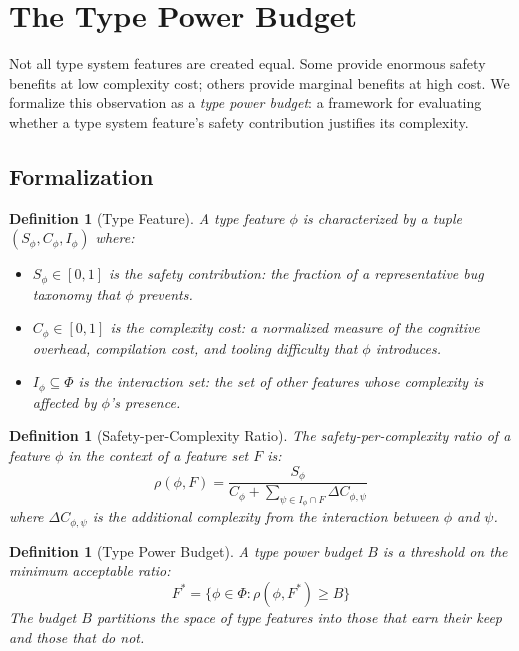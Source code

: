 \documentclass[11pt,twocolumn]{article}
\newtheorem{definition}[theorem]{Definition}
\begin{document}
\section{The Type Power Budget}
\label{sec:type-power-budget}

Not all type system features are created equal.
Some provide enormous safety benefits at low complexity cost; others provide marginal benefits at high cost.
We formalize this observation as a \emph{type power budget}: a framework for evaluating whether a type system feature's safety contribution justifies its complexity.

\subsection{Formalization}

\begin{definition}[Type Feature]
A type feature $\phi$ is characterized by a tuple $(S_\phi, C_\phi, I_\phi)$ where:
\begin{itemize}
\item $S_\phi \in [0, 1]$ is the \emph{safety contribution}: the fraction of a representative bug taxonomy that $\phi$ prevents.
\item $C_\phi \in [0, 1]$ is the \emph{complexity cost}: a normalized measure of the cognitive overhead, compilation cost, and tooling difficulty that $\phi$ introduces.
\item $I_\phi \subseteq \Phi$ is the \emph{interaction set}: the set of other features whose complexity is affected by $\phi$'s presence.
\end{itemize}
\end{definition}

\begin{definition}[Safety-per-Complexity Ratio]
The safety-per-complexity ratio of a feature $\phi$ in the context of a feature set $F$ is:
\[
\rho(\phi, F) = \frac{S_\phi}{\displaystyle C_\phi + \sum_{\psi \in I_\phi \cap F} \Delta C_{\phi,\psi}}
\]
where $\Delta C_{\phi,\psi}$ is the additional complexity from the interaction between $\phi$ and $\psi$.
\end{definition}

\begin{definition}[Type Power Budget]
A type power budget $B$ is a threshold on the minimum acceptable ratio:
\[
F^* = \{\phi \in \Phi : \rho(\phi, F^*) \geq B\}
\]
The budget $B$ partitions the space of type features into those that earn their keep and those that do not.
\end{definition}
\end{document}
